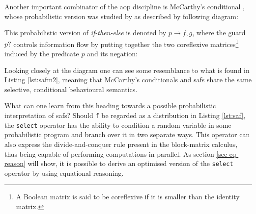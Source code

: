 \documentclass[
  oneside,
  11pt, a4paper,
  footinclude=true,
  headinclude=true,
  cleardoublepage=empty
]{scrbook}
\theoremstyle{definition}
\theoremstyle{definition}
\begin{document}
        Another important combinator of the \gls{aop} discipline is McCarthy's conditional \citep{Bird:1997:AP:248932}, whose probabilistic version was studied by \cite{oliveira2012towards} as described by following diagram:
        
        \begin{center}\label{dig-mccarthy}
        \end{center}{}
        
        \noindent This probabilistic version of \emph{if-then-else} is denoted by $p \rightarrow f,g$, where the guard $p?$ controls information flow by putting together the two coreflexive matrices\footnote{A Boolean matrix is said to be coreflexive if it is smaller than the identity matrix.} induced by the predicate $p$ and its negation:
        
        \begin{center}
        \end{center}{}
        
        \noindent Looking closely at the diagram one can see some resemblance to what is found in Listing \ref{lst:safm2}, meaning that McCarthy's conditionals and \glspl{saf} share the same selective, conditional behavioural semantics.
        
        What can one learn from this heading towards a possible probabilistic interpretation of \glspl{saf}? Should \texttt{f} be regarded as a distribution in Listing \ref{lst:saf}, the \texttt{select} operator has the ability to condition a random variable in some probabilistic program and branch over it in two separate ways. This operator can also express the divide-and-conquer rule present in the block-matrix calculus, thus being capable of performing computations in parallel. As section \ref{sec-eq-reason} will show, it is possible to derive an optimised version of the \texttt{select} operator by using equational reasoning.
        
\end{document}
